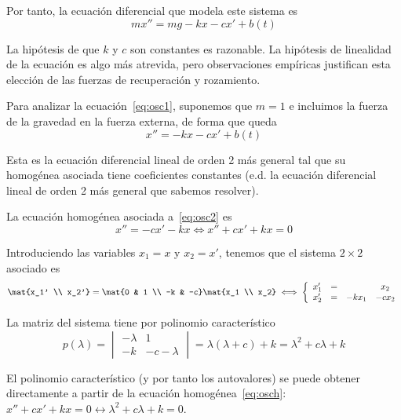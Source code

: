 \documentclass[../main.tex]{subfiles}
\begin{document}
Por tanto, la ecuación diferencial que modela este sistema es
\begin{equation} \label{eq:osc1}
  mx'' = mg - kx - cx' + b(t)
\end{equation}

\begin{remark}
  La hipótesis de que \(k\) y \(c\) son constantes es razonable. La hipótesis de
  linealidad de la ecuación es algo más atrevida, pero observaciones empíricas
  justifican esta elección de las fuerzas de recuperación y rozamiento.
\end{remark}

Para analizar la ecuación~\eqref{eq:osc1}, suponemos que \(m=1\) e incluimos la
fuerza de la gravedad en la fuerza externa, de forma que queda
\begin{equation} \label{eq:osc2}
  x'' = - kx - cx' + b(t)
\end{equation}

\begin{remark}
  Esta es la ecuación diferencial lineal de orden 2 más general tal que su
  homogénea asociada tiene coeficientes constantes (e.d. la ecuación diferencial
  lineal de orden 2 más general que sabemos resolver).
\end{remark}

La ecuación homogénea asociada a~\eqref{eq:osc2} es
\begin{equation} \label{eq:osch}
  x'' = - cx' - kx \iff x'' + cx' + kx = 0
\end{equation}

Introduciendo las variables \(x_1 = x\) y \(x_2 = x'\), tenemos que el sistema
\(2 \times 2\) asociado es
\[\mat{x_1' \\ x_2'} = \mat{0 & 1 \\ -k & -c} \mat{x_1 \\ x_2} \iff
  \left\{\begin{array}{c c c c}
          x_1' & = & & x_2 \\
          x_2' & = & -kx_1 & -cx_2
  \end{array}\right.
\]

La matriz del sistema tiene por polinomio característico
\[
  p(\lambda) =
  \begin{vmatrix}
    -\lambda & 1 \\ -k & -c-\lambda
  \end{vmatrix} =
  \lambda(\lambda + c) + k = \lambda^2 + c\lambda + k
\]
\begin{remark}
  El polinomio característico (y por tanto los autovalores) se puede obtener
  directamente a partir de la ecuación homogénea~\eqref{eq:osch}: \(x'' + cx' +
  kx = 0 \leftrightarrow \lambda^2 + c\lambda + k = 0\).
\end{remark}
\end{document}
